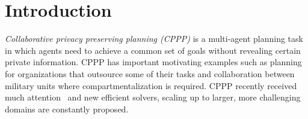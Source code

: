 \documentclass[letterpaper]{article}
\newcommand\roni[1]{\textcolor{blue}{roni: #1}}
\theoremstyle{definition}
\begin{document}
\section{Introduction}



{\em Collaborative privacy preserving planning (CPPP)} is a multi-agent planning task in which agents need to achieve a common set of goals without revealing certain private information. CPPP has important motivating examples such as planning for organizations that outsource some of their tasks and collaboration between military units where compartmentalization is required. CPPP recently received much attention~\cite{brafman2013complexity,nissim2014distributed,Brafman15,torreno2014aFlexible,maliah2014privacyPreserving,torreno2014fmap,torreno2015global,tovzivcka2014generating,jakubuv2015multiagent} and new efficient solvers, scaling up to larger, more challenging domains are constantly proposed.


\end{document}
